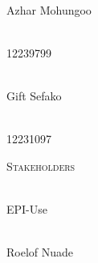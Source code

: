 \begin{titlepage}
\begin{center}
		
		\begin{minipage}{0.4\textwidth}
			\begin{flushleft} \large
				\emph{} \\
				Azhar {Mohungoo }
			\end{flushleft}
		\end{minipage}
		\begin{minipage}{0.4\textwidth}
			\begin{flushright} \large
				\emph{} \\
				12239799
			\end{flushright}
		\end{minipage}
		
		
		\begin{minipage}{0.4\textwidth}
			\begin{flushleft} \large
				\emph{} \\
				Gift {Sefako }
			\end{flushleft}
		\end{minipage}
		\begin{minipage}{0.4\textwidth}
			\begin{flushright} \large
				\emph{} \\
				12231097
			\end{flushright}
		\end{minipage}
		
		\textsc{\Large Stakeholders}\\[1cm]	
				
		\begin{minipage}{0.4\textwidth}
			\begin{flushleft} \large
				\emph{} \\
				EPI-Use
			\end{flushleft}
		\end{minipage}
		\begin{minipage}{0.4\textwidth}
			\begin{flushright} \large
				\emph{} \\
				Roelof Nuade
			\end{flushright}
		\end{minipage}
		
	\end{center}
\end{titlepage}